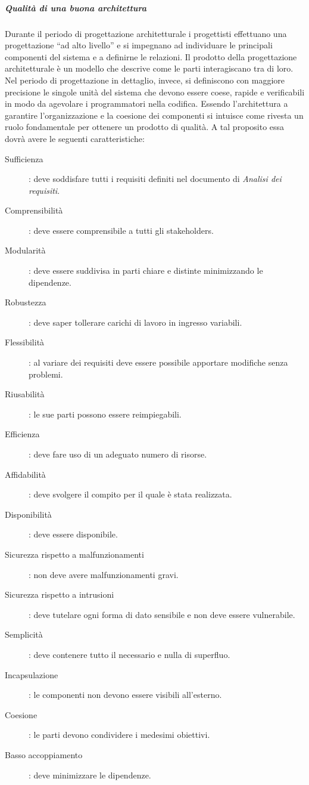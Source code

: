 \documentclass[../../norme-di-progetto.tex]{subfiles}
\begin{document}
\subparagraph{Qualità di una buona architettura}%
\label{subp:qualita_di_una_buona_architettura}

Durante il periodo di progettazione architetturale i progettisti effettuano una progettazione ``ad alto livello'' e si impegnano ad individuare le principali componenti del sistema e a definirne le relazioni. Il prodotto della progettazione architetturale è un modello che descrive come le parti interagiscano tra di loro. Nel periodo di progettazione in dettaglio, invece, si definiscono con maggiore precisione le singole unità del sistema che devono essere coese, rapide e verificabili in modo da agevolare i programmatori nella codifica. Essendo l'architettura a garantire l'organizzazione e la coesione dei componenti si intuisce come rivesta un ruolo fondamentale per ottenere un prodotto di qualità. A tal proposito essa dovrà avere le seguenti caratteristiche:
\begin{description}
  \item [Sufficienza]: deve soddisfare tutti i requisiti definiti nel documento di \textit{Analisi dei requisiti}.
  \item [Comprensibilità]: deve essere comprensibile a tutti gli stakeholders.
  \item [Modularità]: deve essere suddivisa in parti chiare e distinte minimizzando le dipendenze.
  \item [Robustezza]: deve saper tollerare carichi di lavoro in ingresso variabili.
  \item [Flessibilità]: al variare dei requisiti deve essere possibile apportare modifiche senza problemi.
  \item [Riusabilità]: le sue parti possono essere reimpiegabili.
  \item [Efficienza]: deve fare uso di un adeguato numero di risorse.
  \item [Affidabilità]: deve svolgere il compito per il quale è stata realizzata.
  \item [Disponibilità]: deve essere disponibile.
  \item [Sicurezza rispetto a malfunzionamenti]: non deve avere malfunzionamenti gravi.
  \item [Sicurezza rispetto a intrusioni]: deve tutelare ogni forma di dato sensibile e non deve essere vulnerabile.
  \item [Semplicità]: deve contenere tutto il necessario e nulla di superfluo.
  \item [Incapsulazione]: le componenti non devono essere visibili all'esterno.
  \item [Coesione]: le parti devono condividere i medesimi obiettivi.
  \item [Basso accoppiamento]: deve minimizzare le dipendenze.
\end{description}
\end{document}
